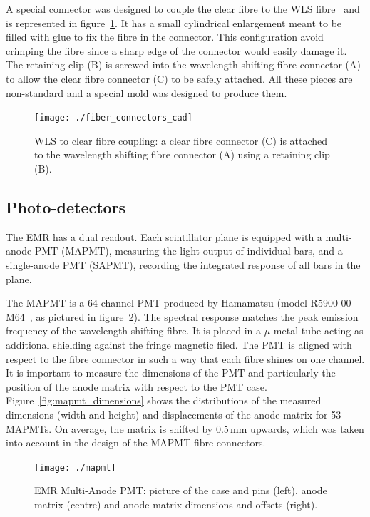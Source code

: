 \documentclass[a4paper,11pt]{article}
\begin{document}
A special connector was designed to couple the clear fibre to the WLS fibre~\cite{emr_design_change} and is represented in figure~\ref{fig:fibre_connectors_cad}. It has a small
cylindrical enlargement meant to be filled with glue to fix the fibre in the connector. This configuration avoid crimping the fibre since a sharp edge of the connector would easily damage it. The retaining clip (B) is screwed into the wavelength shifting fibre connector (A) to allow the clear fibre connector (C) to be safely attached. 
All these pieces are non-standard and a special mold was designed to produce them. 

\begin{figure}[htp!]
 \centering
 \texttt{[image: ./fiber\_connectors\_cad]}
 \caption[Clear fibre connector]{WLS to clear fibre coupling: a clear fibre connector (C) is attached to the wavelength shifting fibre connector (A) using a retaining clip (B).}
 \label{fig:fibre_connectors_cad}
\end{figure}

\subsection{Photo-detectors}
The EMR has a dual readout. Each scintillator plane is equipped with a multi-anode PMT (MAPMT), measuring
the light output of individual bars, and a single-anode PMT (SAPMT), recording the integrated response of all bars in the plane. 

The MAPMT is a 64-channel PMT produced by Hamamatsu (model R5900-00-M64~\cite{hamamatsu_mapmt}, as pictured in
figure~\ref{fig:mapmt}). The spectral response matches the peak emission frequency of the wavelength shifting fibre. It is 
placed in a $\mu$-metal tube acting as additional shielding against the fringe magnetic filed.
The PMT is aligned with respect to the fibre connector in such a way that each fibre shines on one
channel. It is important to measure the dimensions of the PMT and particularly the position of the anode matrix with respect to the
PMT case. Figure~\ref{fig:mapmt_dimensions} shows the distributions of the measured dimensions (width and
height) and displacements of the anode matrix for 53 MAPMTs. On average, the matrix is shifted by 0.5\,mm upwards, which was taken into account in the design of the
MAPMT fibre connectors.

\begin{figure}[h]
 \centering
 \texttt{[image: ./mapmt]}
 \caption[Multi-Anode PMT]{EMR Multi-Anode PMT: picture of the case and pins (left), anode matrix (centre) and anode matrix dimensions and offsets (right).}
 \label{fig:mapmt}
\end{figure}
\end{document}
